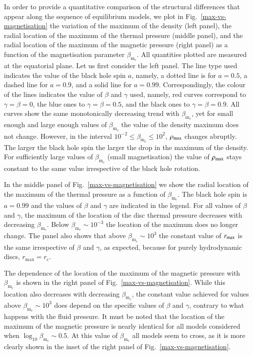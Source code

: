 \documentclass[referee]{aa}
\begin{document}
In order to provide a quantitative comparison of the structural differences that appear along the sequence of equilibrium models, we plot in Fig.~\ref{max-vs-magnetisation} the variation of the maximum of the density (left panel), the radial location of the maximum of the thermal pressure (middle panel), and the radial location of the maximum of the magnetic pressure (right panel) as a function of the magnetisation parameter $\beta_{\mathrm{m}_{\mathrm{c}}}$. All quantities plotted are measured at the equatorial plane. Let us first consider the left panel. The line type used indicates the value of the black hole spin $a$, namely, a dotted line is for $a=0.5$, a dashed line for $a=0.9$, and a solid line for $a=0.99$. Correspondingly, the colour of the lines indicates the value of $\beta$ and $\gamma$ used, namely, red curves correspond to $\gamma=\beta=0$, the blue ones to $\gamma=\beta=0.5$, and the black ones to $\gamma=\beta=0.9$. All curves show the same monotonically decreasing trend with $\beta_{\mathrm{m}_{\mathrm{c}}}
$, yet for small enough and large enough values of $\beta_{\mathrm{m}_{\mathrm{c}}} $ the value of the density maximum does not change. However, in the interval $10^{-2}\le \beta_{\mathrm{m}_{\mathrm{c}}} \le 10^{2}$, $\rho_{\rm max}$ changes abruptly. The larger the black hole spin the larger the drop in the maximum of the density. For sufficiently large values of $\beta_{\mathrm{m}_{\mathrm{c}}}$ (small magnetisation) the value of $\rho_{\rm max}$ stays constant to the same value irrespective of the black hole rotation.

In the middle panel of Fig.~\ref{max-vs-magnetisation} we show the radial location of the maximum of the thermal pressure as a function of $\beta_{\mathrm{m}_{\mathrm{c}}}$. The black hole spin is $a=0.99$ and the values of $\beta$ and $\gamma$ are indicated in the legend. For all values of $\beta$ and $\gamma$, the maximum of the location of the disc thermal pressure decreases with decreasing $\beta_{\mathrm{m}_{\mathrm{c}}}$. Below $\beta_{\mathrm{m}_{\mathrm{c}}}\sim 10^{-3}$ the location of the maximum does no longer change. The panel also shows that above $\beta_{\mathrm{m}_{\mathrm{c}}}\sim 10^{3}$ the constant value of $r_{\rm max}$ is the same irrespective of $\beta$ and $\gamma$, as expected, because for purely hydrodynamic discs, $r_{\mathrm{max}} = r_{\mathrm{c}}$.

The dependence of the location of the maximum of the magnetic pressure with $\beta_{\mathrm{m}_{\mathrm{c}}}$ is shown in the right panel of Fig.~\ref{max-vs-magnetisation}. While this location also decreases with decreasing $\beta_{\mathrm{m}_{\mathrm{c}}}$, the constant value achieved for values above $\beta_{\mathrm{m}_{\mathrm{c}}}\sim 10^{3}$ does depend on the specific values of $\beta$ and $\gamma$, contrary to what happens with the fluid pressure. It must be noted that the location of the maximum of the magnetic pressure is nearly identical for all models considered when $\log_{10}\beta_{\mathrm{m}_{\mathrm{c}}} \sim 0.5$. At this value of $\beta_{\mathrm{m}_{\mathrm{c}}}$ all models seem to cross, as it is more clearly shown in the inset of the right panel of Fig.~\ref{max-vs-magnetisation}.
\end{document}
